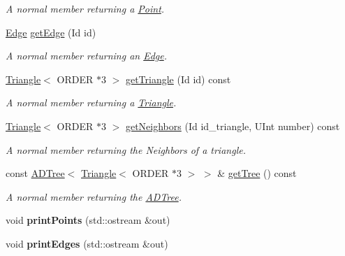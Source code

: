 \begin{DoxyCompactItemize}
\begin{DoxyCompactList}\small\item\em A normal member returning a \hyperlink{classPoint}{Point}. \item\end{DoxyCompactList}\item 
\hyperlink{classEdge}{Edge} \hyperlink{classMeshHandler_a346871cf4c2aa8082e81a76dd7ef5373}{getEdge} (Id id)
\begin{DoxyCompactList}\small\item\em A normal member returning an \hyperlink{classEdge}{Edge}. \item\end{DoxyCompactList}\item 
\hyperlink{classTriangle}{Triangle}$<$ ORDER $\ast$3 $>$ \hyperlink{classMeshHandler_affac7f7128b883d6a0a6cdd19c1bd9bd}{getTriangle} (Id id) const 
\begin{DoxyCompactList}\small\item\em A normal member returning a \hyperlink{classTriangle}{Triangle}. \item\end{DoxyCompactList}\item 
\hyperlink{classTriangle}{Triangle}$<$ ORDER $\ast$3 $>$ \hyperlink{classMeshHandler_a67e2b3d75d30094f0a5a8d72213bdca3}{getNeighbors} (Id id\_\-triangle, UInt number) const 
\begin{DoxyCompactList}\small\item\em A normal member returning the Neighbors of a triangle. \item\end{DoxyCompactList}\item 
const \hyperlink{classADTree}{ADTree}$<$ \hyperlink{classTriangle}{Triangle}$<$ ORDER $\ast$3 $>$ $>$ \& \hyperlink{classMeshHandler_abdd94b51080aa42f94b22bc1b472c072}{getTree} () const 
\begin{DoxyCompactList}\small\item\em A normal member returning the \hyperlink{classADTree}{ADTree}. \item\end{DoxyCompactList}\item 
\hypertarget{classMeshHandler_acca90db9207de18c3352398ba8d47508}{
void {\bfseries printPoints} (std::ostream \&out)}
\label{classMeshHandler_acca90db9207de18c3352398ba8d47508}

\item 
\hypertarget{classMeshHandler_a935859b0c11df03282b36c12ccdba06a}{
void {\bfseries printEdges} (std::ostream \&out)}
\label{classMeshHandler_a935859b0c11df03282b36c12ccdba06a}


\end{DoxyCompactItemize}
